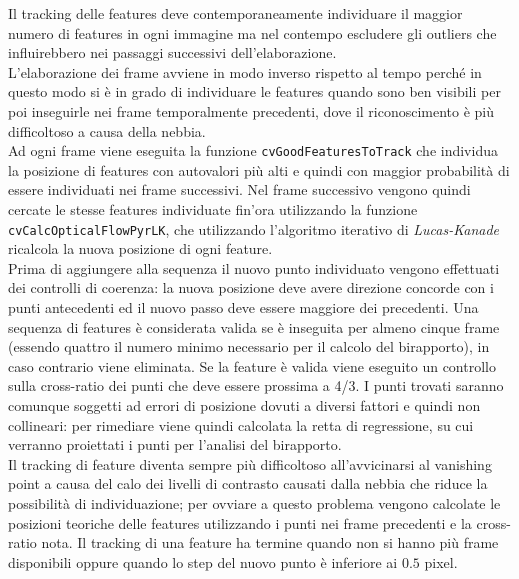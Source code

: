 \documentclass[12pt]{report}
\begin{document}
\noindent Il tracking delle features deve contemporaneamente individuare il maggior numero di features in ogni immagine ma nel contempo escludere gli outliers che influirebbero nei passaggi successivi dell'elaborazione.\\
L'elaborazione dei frame avviene in modo inverso rispetto al tempo perch\'e in questo modo si \`e in grado di individuare le features quando sono ben visibili per poi inseguirle nei frame temporalmente precedenti, dove il riconoscimento \`e pi\`u difficoltoso a causa della nebbia.\\

\noindent Ad ogni frame viene eseguita la funzione \verb|cvGoodFeaturesToTrack| che individua la posizione di features con autovalori pi\`u alti e quindi con maggior probabilit\`a di essere individuati nei frame successivi. Nel frame successivo vengono quindi cercate le stesse features individuate fin'ora utilizzando la funzione \verb|cvCalcOpticalFlowPyrLK|, che utilizzando l'algoritmo iterativo di \emph{Lucas-Kanade}~\cite{lucaskanade81} ricalcola la nuova posizione di ogni feature.\\

\noindent Prima di aggiungere alla sequenza il nuovo punto individuato vengono effettuati dei controlli di coerenza: la nuova posizione deve avere direzione concorde con i punti antecedenti ed il nuovo passo deve essere maggiore dei precedenti. Una sequenza di features \`e considerata valida se \`e inseguita per almeno cinque frame (essendo quattro il numero minimo necessario per il calcolo del birapporto), in caso contrario viene eliminata. Se la feature \`e valida viene eseguito un controllo sulla cross-ratio dei punti che deve essere prossima a 4/3. I punti trovati saranno comunque soggetti ad errori di posizione dovuti a diversi fattori e quindi non collineari: per rimediare viene quindi calcolata la retta di regressione, su cui verranno proiettati i punti per l'analisi del birapporto.\\

\noindent Il tracking di feature diventa sempre pi\`u difficoltoso all'avvicinarsi al vanishing point a causa del calo dei livelli di contrasto causati dalla nebbia che riduce la possibilit\`a di individuazione; per ovviare a questo problema vengono calcolate le posizioni teoriche delle features utilizzando i punti nei frame precedenti e la cross-ratio nota. Il tracking di una feature ha termine quando non si hanno pi\`u frame disponibili oppure quando lo step del nuovo punto \`e inferiore ai $0.5$ pixel.
\end{document}
